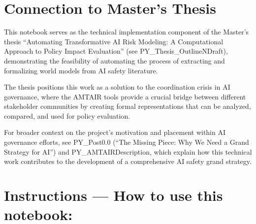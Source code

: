 \documentclass[
  11pt,
  letterpaper,
]{book}
\begin{document}
\section{Connection to Master's
Thesis}\label{connection-to-masters-thesis}

This notebook serves as the technical implementation component of the
Master's thesis ``Automating Transformative AI Risk Modeling: A
Computational Approach to Policy Impact Evaluation'' (see
PY\_Thesis\_OutlineNDraft), demonstrating the feasibility of automating
the process of extracting and formalizing world models from AI safety
literature.

The thesis positions this work as a solution to the coordination crisis
in AI governance, where the AMTAIR tools provide a crucial bridge
between different stakeholder communities by creating formal
representations that can be analyzed, compared, and used for policy
evaluation.

For broader context on the project's motivation and placement within AI
governance efforts, see PY\_Post0.0 (``The Missing Piece: Why We Need a
Grand Strategy for AI'') and PY\_AMTAIRDescription, which explain how
this technical work contributes to the development of a comprehensive AI
safety grand strategy.

\section{Instructions --- How to use this
notebook:}\label{instructions-how-to-use-this-notebook}
\end{document}
